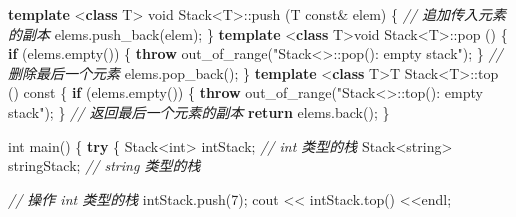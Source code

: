 \documentclass[
]{article}
\newenvironment{Shaded}{}{}
\newcommand{\AttributeTok}[1]{\textcolor[rgb]{0.49,0.56,0.16}{#1}}
\newcommand{\CommentTok}[1]{\textcolor[rgb]{0.38,0.63,0.69}{\textit{#1}}}
\newcommand{\ControlFlowTok}[1]{\textcolor[rgb]{0.00,0.44,0.13}{\textbf{#1}}}
\newcommand{\DataTypeTok}[1]{\textcolor[rgb]{0.56,0.13,0.00}{#1}}
\newcommand{\DecValTok}[1]{\textcolor[rgb]{0.25,0.63,0.44}{#1}}
\newcommand{\KeywordTok}[1]{\textcolor[rgb]{0.00,0.44,0.13}{\textbf{#1}}}
\newcommand{\NormalTok}[1]{#1}
\newcommand{\OperatorTok}[1]{\textcolor[rgb]{0.40,0.40,0.40}{#1}}
\newcommand{\StringTok}[1]{\textcolor[rgb]{0.25,0.44,0.63}{#1}}
\begin{document}
\begin{Shaded}
\begin{Highlighting}[]
\KeywordTok{template} \OperatorTok{\textless{}}\KeywordTok{class}\NormalTok{ T}\OperatorTok{\textgreater{}}
\DataTypeTok{void}\NormalTok{ Stack}\OperatorTok{\textless{}}\NormalTok{T}\OperatorTok{\textgreater{}::}\NormalTok{push }\OperatorTok{(}\NormalTok{T }\AttributeTok{const}\OperatorTok{\&}\NormalTok{ elem}\OperatorTok{)} \OperatorTok{\{} 
    \CommentTok{// 追加传入元素的副本}
\NormalTok{    elems}\OperatorTok{.}\NormalTok{push\_back}\OperatorTok{(}\NormalTok{elem}\OperatorTok{);}    \OperatorTok{\}} \KeywordTok{template} \OperatorTok{\textless{}}\KeywordTok{class}\NormalTok{ T}\OperatorTok{\textgreater{}}\DataTypeTok{void}\NormalTok{ Stack}\OperatorTok{\textless{}}\NormalTok{T}\OperatorTok{\textgreater{}::}\NormalTok{pop }\OperatorTok{()} \OperatorTok{\{} 
    \ControlFlowTok{if} \OperatorTok{(}\NormalTok{elems}\OperatorTok{.}\NormalTok{empty}\OperatorTok{())} \OperatorTok{\{} 
        \ControlFlowTok{throw}\NormalTok{ out\_of\_range}\OperatorTok{(}\StringTok{"Stack\textless{}\textgreater{}::pop(): empty stack"}\OperatorTok{);} 
    \OperatorTok{\}}
    \CommentTok{// 删除最后一个元素}
\NormalTok{    elems}\OperatorTok{.}\NormalTok{pop\_back}\OperatorTok{();}         \OperatorTok{\}} \KeywordTok{template} \OperatorTok{\textless{}}\KeywordTok{class}\NormalTok{ T}\OperatorTok{\textgreater{}}\NormalTok{T Stack}\OperatorTok{\textless{}}\NormalTok{T}\OperatorTok{\textgreater{}::}\NormalTok{top }\OperatorTok{()} \AttributeTok{const} \OperatorTok{\{} 
    \ControlFlowTok{if} \OperatorTok{(}\NormalTok{elems}\OperatorTok{.}\NormalTok{empty}\OperatorTok{())} \OperatorTok{\{} 
        \ControlFlowTok{throw}\NormalTok{ out\_of\_range}\OperatorTok{(}\StringTok{"Stack\textless{}\textgreater{}::top(): empty stack"}\OperatorTok{);} 
    \OperatorTok{\}}
    \CommentTok{// 返回最后一个元素的副本 }
    \ControlFlowTok{return}\NormalTok{ elems}\OperatorTok{.}\NormalTok{back}\OperatorTok{();}      
\OperatorTok{\}}

\DataTypeTok{int}\NormalTok{ main}\OperatorTok{()} \OperatorTok{\{} 
    \ControlFlowTok{try} \OperatorTok{\{} 
\NormalTok{        Stack}\OperatorTok{\textless{}}\DataTypeTok{int}\OperatorTok{\textgreater{}}\NormalTok{         intStack}\OperatorTok{;}  \CommentTok{// int 类型的栈 }
\NormalTok{        Stack}\OperatorTok{\textless{}}\NormalTok{string}\OperatorTok{\textgreater{}}\NormalTok{ stringStack}\OperatorTok{;}    \CommentTok{// string 类型的栈 }

        \CommentTok{// 操作 int 类型的栈 }
\NormalTok{        intStack}\OperatorTok{.}\NormalTok{push}\OperatorTok{(}\DecValTok{7}\OperatorTok{);} 
\NormalTok{        cout }\OperatorTok{\textless{}\textless{}}\NormalTok{ intStack}\OperatorTok{.}\NormalTok{top}\OperatorTok{()} \OperatorTok{\textless{}\textless{}}\NormalTok{endl}\OperatorTok{;} 


\end{Highlighting}
\end{Shaded}
\end{document}

